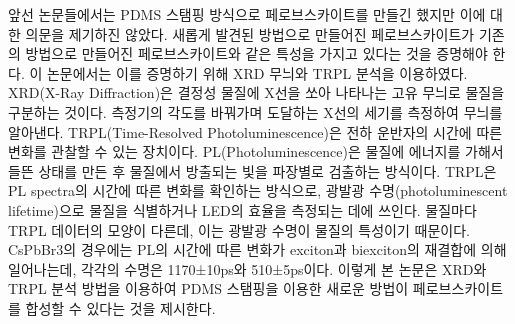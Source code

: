 앞선 논문들에서는 PDMS 스탬핑 방식으로 페로브스카이트를 만들긴 했지만 이에 대한 의문을 제기하진 않았다. 새롭게 발견된 방법으로 만들어진 페로브스카이트가 기존의 방법으로 만들어진 페로브스카이트와 같은 특성을 가지고 있다는 것을 증명해야 한다. 이 논문에서는 이를 증명하기 위해 XRD 무늬와 TRPL 분석을 이용하였다. 
XRD(X-Ray Diffraction)은 결정성 물질에 X선을 쏘아 나타나는 고유 무늬로 물질을 구분하는 것이다. 측정기의 각도를 바꿔가며 도달하는 X선의 세기를 측정하여 무늬를 알아낸다. 
TRPL(Time-Resolved Photoluminescence)은 전하 운반자의 시간에 따른 변화를 관찰할 수 있는 장치이다. PL(Photoluminescence)은 물질에 에너지를 가해서 들뜬 상태를 만든 후 물질에서 방출되는 빛을 파장별로 검출하는 방식이다. TRPL은 PL spectra의 시간에 따른 변화를 확인하는 방식으로, 광발광 수명(photoluminescent lifetime)으로 물질을 식별하거나 LED의 효율을 측정되는 데에 쓰인다. 물질마다 TRPL 데이터의 모양이 다른데, 이는 광발광 수명이 물질의 특성이기 때문이다. CsPbBr3의 경우에는 PL의 시간에 따른 변화가 exciton과 biexciton의 재결합에 의해 일어나는데, 각각의 수명은 1170±10ps와 510±5ps이다\cite{chen2018room}. 
이렇게 본 논문은 XRD와 TRPL 분석 방법을 이용하여 PDMS 스탬핑을 이용한 새로운 방법이 페로브스카이트를 합성할 수 있다는 것을 제시한다. 

